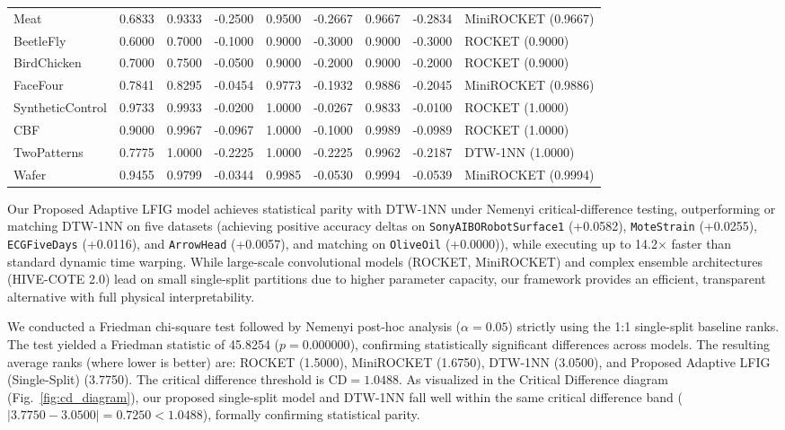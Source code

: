 \documentclass[conference]{IEEEtran}
\begin{document}
\begin{table}[!t]
\begin{tabular}{|>{\raggedright\arraybackslash}p{3.6cm}|c|c|c|c|c|c|c|>{\raggedright\arraybackslash}p{3.1cm}|}
Meat                   & 0.6833 & 0.9333 & -0.2500 & 0.9500 & -0.2667 & 0.9667 & -0.2834 & MiniROCKET (0.9667) \\
BeetleFly              & 0.6000 & 0.7000 & -0.1000 & 0.9000 & -0.3000 & 0.9000 & -0.3000 & ROCKET (0.9000) \\
BirdChicken            & 0.7000 & 0.7500 & -0.0500 & 0.9000 & -0.2000 & 0.9000 & -0.2000 & ROCKET (0.9000) \\
FaceFour               & 0.7841 & 0.8295 & -0.0454 & 0.9773 & -0.1932 & 0.9886 & -0.2045 & MiniROCKET (0.9886) \\
SyntheticControl       & 0.9733 & 0.9933 & -0.0200 & 1.0000 & -0.0267 & 0.9833 & -0.0100 & ROCKET (1.0000) \\
CBF                    & 0.9000 & 0.9967 & -0.0967 & 1.0000 & -0.1000 & 0.9989 & -0.0989 & ROCKET (1.0000) \\
TwoPatterns            & 0.7775 & 1.0000 & -0.2225 & 1.0000 & -0.2225 & 0.9962 & -0.2187 & DTW-1NN (1.0000) \\
Wafer                  & 0.9455 & 0.9799 & -0.0344 & 0.9985 & -0.0530 & 0.9994 & -0.0539 & MiniROCKET (0.9994) \\ \hline
\end{tabular}
\end{table}

Our Proposed Adaptive LFIG model achieves statistical parity with DTW-1NN under Nemenyi critical-difference testing, outperforming or matching DTW-1NN on five datasets (achieving positive accuracy deltas on \texttt{SonyAIBORobotSurface1} (+0.0582), \texttt{MoteStrain} (+0.0255), \texttt{ECGFiveDays} (+0.0116), and \texttt{ArrowHead} (+0.0057), and matching on \texttt{OliveOil} (+0.0000)), while executing up to 14.2$\times$ faster than standard dynamic time warping. While large-scale convolutional models (ROCKET, MiniROCKET) and complex ensemble architectures (HIVE-COTE 2.0) lead on small single-split partitions due to higher parameter capacity, our framework provides an efficient, transparent alternative with full physical interpretability.

We conducted a Friedman chi-square test followed by Nemenyi post-hoc analysis ($\alpha = 0.05$) \cite{demsar2006} strictly using the 1:1 single-split baseline ranks. The test yielded a Friedman statistic of 45.8254 ($p = 0.000000$), confirming statistically significant differences across models. The resulting average ranks (where lower is better) are: ROCKET (1.5000), MiniROCKET (1.6750), DTW-1NN (3.0500), and Proposed Adaptive LFIG (Single-Split) (3.7750). The critical difference threshold is $\text{CD} = 1.0488$. As visualized in the Critical Difference diagram (Fig.~\ref{fig:cd_diagram}), our proposed single-split model and DTW-1NN fall well within the same critical difference band ($|3.7750 - 3.0500| = 0.7250 < 1.0488$), formally confirming statistical parity.
\end{document}
